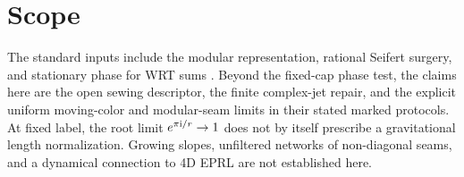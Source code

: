 \documentclass[11pt]{article}
\newcommand\ii{{\rm i}}
\begin{document}


\section*{Scope}
The standard inputs include the modular representation, rational Seifert surgery, and stationary phase for WRT sums \cite{Jeffrey,HT,Hansen,Charles,Rozansky,ColoredTori}. Beyond the fixed-cap phase test, the claims here are the open sewing descriptor, the finite complex-jet repair, and the explicit uniform moving-color and modular-seam limits in their stated marked protocols. At fixed label, the root limit \(e^{\pi\ii/r}\to1\) does not by itself prescribe a gravitational length normalization. Growing slopes, unfiltered networks of non-diagonal seams, and a dynamical connection to 4D EPRL are not established here.
\end{document}
